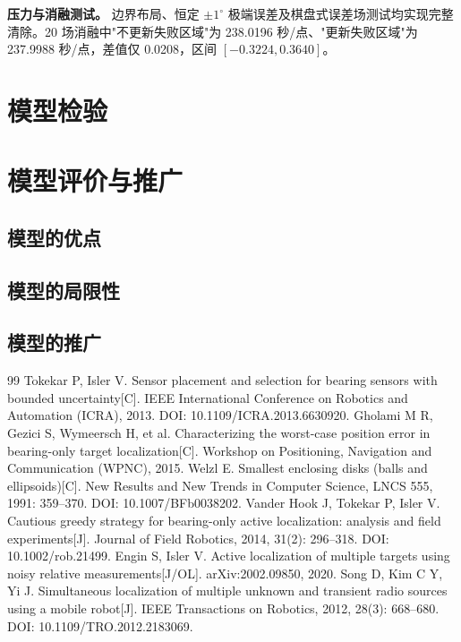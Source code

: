 \documentclass[UTF8,a4paper,zihao=-4,fontset=none]{ctexart}
\begin{document}
\textbf{压力与消融测试。} 边界布局、恒定 $\pm1^\circ$ 极端误差及棋盘式误差场测试均实现完整清除。20 场消融中"不更新失败区域"为 238.0196 秒/点、"更新失败区域"为 237.9988 秒/点，差值仅 0.0208，区间 $[-0.3224,0.3640]$。

\section{模型检验}

\section{模型评价与推广}

\subsection{模型的优点}

\subsection{模型的局限性}


\subsection{模型的推广}


\begin{thebibliography}{99}
   Tokekar P, Isler V. Sensor placement and selection for bearing sensors with bounded uncertainty[C]. IEEE International Conference on Robotics and Automation (ICRA), 2013. DOI: 10.1109/ICRA.2013.6630920.
   Gholami M R, Gezici S, Wymeersch H, et al. Characterizing the worst-case position error in bearing-only target localization[C]. Workshop on Positioning, Navigation and Communication (WPNC), 2015.
   Welzl E. Smallest enclosing disks (balls and ellipsoids)[C]. New Results and New Trends in Computer Science, LNCS 555, 1991: 359--370. DOI: 10.1007/BFb0038202.
   Vander Hook J, Tokekar P, Isler V. Cautious greedy strategy for bearing-only active localization: analysis and field experiments[J]. Journal of Field Robotics, 2014, 31(2): 296--318. DOI: 10.1002/rob.21499.
   Engin S, Isler V. Active localization of multiple targets using noisy relative measurements[J/OL]. arXiv:2002.09850, 2020.
   Song D, Kim C Y, Yi J. Simultaneous localization of multiple unknown and transient radio sources using a mobile robot[J]. IEEE Transactions on Robotics, 2012, 28(3): 668--680. DOI: 10.1109/TRO.2012.2183069.
\end{thebibliography}
\end{document}
